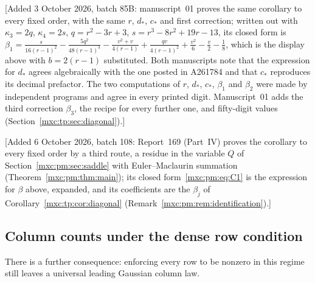 \documentclass[11pt]{article}
\numberwithin{equation}{section}
\theoremstyle{definition}
\theoremstyle{remark}
\begin{document}
[Added 3 October 2026, batch 85B: manuscript~01 proves the same corollary
to every fixed order, with the same $r$, $d_*$, $c_*$ and first
correction; written out with $\kappa_3=2q$, $\kappa_4=2s$,
$q=r^2-3r+3$, $s=r^3-8r^2+19r-13$, its closed form is
$\beta_1=\frac{s}{16(r-1)^2}-\frac{5q^2}{48(r-1)^3}-\frac{v^2+v}{4(r-1)}
+\frac{qv}{4(r-1)^2}+\frac{v^2}6-\frac v2-\frac18$, which is the display
above with $b=2(r-1)$ substituted. Both manuscripts note that the
expression for $d_*$ agrees algebraically with the one posted in A261784
and that $c_*$ reproduces its decimal prefactor. The two computations of
$r$, $d_*$, $c_*$, $\beta_1$ and $\beta_2$ were made by independent
programs and agree in every printed digit. Manuscript~01 adds the third
correction $\beta_3$, the recipe for every further one, and fifty-digit
values (Section~\ref{mxc:tp:sec:diagonal}).]

[Added 6 October 2026, batch 108: Report~169 (Part~IV) proves the
corollary to every fixed order by a third route, a residue in the variable
$Q$ of Section~\ref{mxc:pm:sec:saddle} with Euler--Maclaurin summation
(Theorem~\ref{mxc:pm:thm:main}); its closed form~\eqref{mxc:pm:eq:C1} is the
expression for $\beta$ above, expanded, and its coefficients are the $\beta_j$
of Corollary~\ref{mxc:tp:cor:diagonal}
(Remark~\ref{mxc:pm:rem:identification}).]

\subsection{Column counts under the dense row condition}\label{mxc:sec:dense-columns}
There is a further consequence: enforcing every row to be nonzero in
this regime still leaves a universal leading Gaussian column law.
\end{document}
